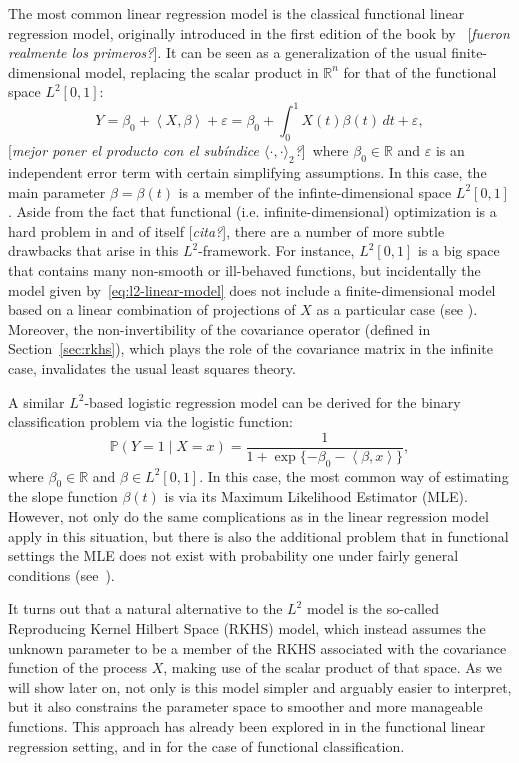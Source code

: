 \documentclass[ba]{imsart}
\numberwithin{equation}{section}
\theoremstyle{plain}
\renewcommand{\epsilon}{\varepsilon}
\newcommand{\R}{\mathbb{R}}
\newcommand\dotprod[2]{\left\langle #1, #2 \right\rangle}
\newcommand\incomment[1]{\color{red}[\textit{#1}]\color{black}}
\begin{document}
The most common linear regression model is the classical functional linear regression model, originally introduced in the first edition of the book by~\citet{ramsay2005functional} \incomment{fueron realmente los primeros?}. It can be seen as a generalization of the usual finite-dimensional model, replacing the scalar product in \(\R^n\) for that of the functional space \(L^2[0,1]\):
\begin{equation}\label{eq:l2-linear-model}
Y = \beta_0 + \dotprod{X}{\beta} + \epsilon = \beta_0 + \int_0^1 X(t)\beta(t)\, dt + \epsilon,
\end{equation}
\incomment{mejor poner el producto con el subíndice \(\langle \cdot , \cdot \rangle_2\)?}~where \(\beta_0\in \R\) and \(\epsilon\) is an independent error term with certain simplifying assumptions. In this case, the main parameter \(\beta=\beta(t)\) is a member of the infinte-dimensional space \(L^2[0, 1]\). Aside from the fact that functional (i.e. infinite-dimensional) optimization is a hard problem in and of itself \incomment{cita?}, there are a number of more subtle drawbacks that arise in this \(L^2\)-framework. For instance, \(L^2[0, 1]\) is a big space that contains many non-smooth or ill-behaved functions, but incidentally the model given by~\eqref{eq:l2-linear-model} does not include a finite-dimensional model based on a linear combination of projections of \(X\) as a particular case (see \citet{berrendero2019rkhs}). Moreover, the non-invertibility of the covariance operator (defined in Section~\ref{sec:rkhs}), which plays the role of the covariance matrix in the infinite case, invalidates the usual least squares theory.

A similar \(L^2\)-based logistic regression model can be derived for the binary classification problem via the logistic function:
\begin{equation}\label{eq:l2-logistic-model}
  \mathbb P(Y=1 \mid X=x) = \frac{1}{1 + \exp\{-\beta_0 - \dotprod{\beta}{x}\}},
\end{equation}
where \(\beta_0 \in \R\) and \(\beta \in L^2[0, 1]\). In this case, the most common way of estimating the slope function \(\beta(t)\) is via its Maximum Likelihood Estimator (MLE). However, not only do the same complications as in the linear regression model apply in this situation, but there is also the additional problem that in functional settings the MLE does not exist with probability one under fairly general conditions (see~\citet[p.~10]{buenolarraz2021functional}).

It turns out that a natural alternative to the \(L^2\) model is the so-called Reproducing Kernel Hilbert Space (RKHS) model, which instead assumes the unknown parameter to be a member of the RKHS associated with the covariance function of the process \(X\), making use of the scalar product of that space. As we will show later on, not only is this model simpler and arguably easier to interpret, but it also constrains the parameter space to smoother and more manageable functions. This approach has already been explored in \citet{berrendero2019rkhs} in the functional linear regression setting, and in \citet{berrendero2018use} for the case of functional classification.
\end{document}
